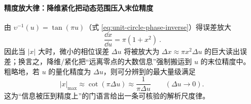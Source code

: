 \paragraph{精度放大律：降维紧化把动态范围压入末位精度}
由 \(\upsilon^{-1}(u)=\tan(\pi u)\)（式 \eqref{eq:unit-circle-phase-inverse}）得误差放大
\begin{equation}\label{eq:app-precision-amplification}
\boxed{\ \frac{\dd x}{\dd u}=\pi(1+x^2)\ }.
\end{equation}
因此当 \(|x|\) 大时，微小的相位误差 \(\Delta u\) 将被放大为 \(\Delta x\approx \pi x^2\Delta u\) 的巨大读出误差；换言之，降维/紧化把“远离零点的大数信息”强制搬运到 \(u\) 的末位精度中。
粗略地，若 \(u\) 的量化精度为 \(\Delta u\)，则可分辨到的最大量级满足
\[
|x|_{\max}\approx \cot(\pi\Delta u)\approx \frac{1}{\pi\Delta u}\qquad(\Delta u\to 0).
\]
这为“信息被压到精度上”的门语言给出一条可核验的解析尺度律。

